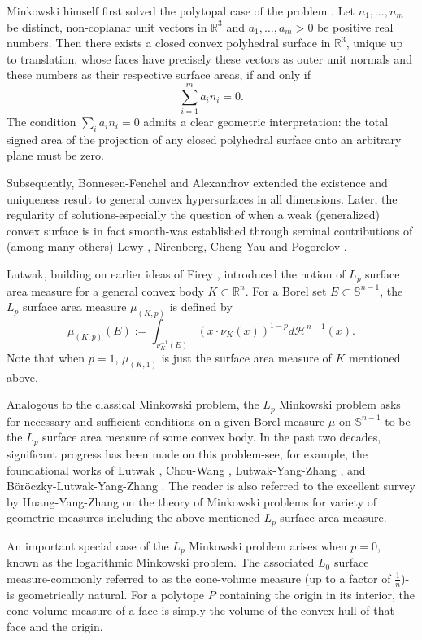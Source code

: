 \documentclass[12pt]{amsart}
\numberwithin{equation}{section}
\numberwithin{lemma}{section}
\numberwithin{proposition}{section}
\numberwithin{corollary}{section}
\numberwithin{remark}{section}
\begin{document}
Minkowski himself first solved the polytopal case of the problem \cite{Mi}. Let $n_1, \ldots, n_m$ be distinct, non-coplanar unit vectors in $\mathbb{R}^3$ and $a_1, \ldots, a_m>0$ be positive real numbers. Then there exists a closed convex polyhedral surface in $\mathbb{R}^3$, unique up to translation, whose faces have precisely these vectors as outer unit normals and these numbers as their respective surface areas, if and only if
$$
\sum_{i=1}^m a_i n_i=0 .
$$
The condition $\sum_i a_i n_i=0$ admits a clear geometric interpretation: the total signed area of the projection of any closed polyhedral surface onto an arbitrary plane must be zero.

Subsequently, Bonnesen-Fenchel\cite{BF} and Alexandrov\cite{Al} extended the existence and uniqueness result to general convex hypersurfaces in all dimensions. Later, the regularity of solutions-especially the question of when a weak (generalized) convex surface is in fact smooth-was established through seminal contributions of (among many others) Lewy \cite{Le}, Nirenberg\cite{Ni}, Cheng-Yau\cite{CY} and Pogorelov \cite{Po}.


Lutwak\cite{Lu}, building on earlier ideas of Firey \cite{F}, introduced the notion of $L_p$ surface area measure for a general convex body $K \subset \mathbb{R}^n$. For a Borel set $E \subset \mathbb{S}^{n-1}$, the $L_p$ surface area measure $\mu_{(K, p)}$ is defined by
$$
\mu_{(K, p)}(E):=\int_{\nu_K^{-1}(E)}\left(x \cdot \nu_K(x)\right)^{1-p} d \mathcal{H}^{n-1}(x).
$$
Note that when $p=1$, $\mu_{(K, 1)}$ is just the surface area measure of $K$ mentioned above.

Analogous to the classical Minkowski problem, the $L_p$ Minkowski problem asks for necessary and sufficient conditions on a given Borel measure $\mu$ on $\mathbb{S}^{n-1}$ to be the $L_p$ surface area measure of some convex body.
In the past two decades, significant progress has been made on this problem-see, for example, the foundational works of Lutwak \cite{Lu}, Chou-Wang \cite{CW}, Lutwak-Yang-Zhang \cite{LYZ}, and Böröczky-Lutwak-Yang-Zhang \cite{BLYZ}. The reader is also referred to the excellent survey by Huang-Yang-Zhang\cite{HYZ} on the theory of Minkowski problems for variety of geometric measures including the above mentioned $L_p$ surface area measure. 

An important special case of the $L_{p}$ Minkowski problem arises when $p=0$, known as the logarithmic Minkowski problem. The associated $L_{0}$ surface measure-commonly referred to as the cone-volume measure (up to a factor of $\frac{1}{n}$)-is geometrically natural. For a polytope $P$ containing the origin in its interior, the cone-volume measure of a face is simply the volume of the convex hull of that face and the origin.
\end{document}
